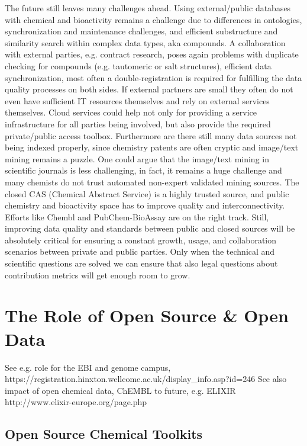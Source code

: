 \documentclass{sig-alternate}
\begin{document}
The future still leaves many challenges ahead. Using external/public databases
with chemical and bioactivity remains a challenge due to differences in
ontologies, synchronization and maintenance challenges, and efficient
substructure and similarity search within complex data types, aka compounds. A
collaboration with external parties, e.g. contract research, poses again
problems with duplicate checking for compounds (e.g. tautomeric or salt
structures), efficient data synchronization, most often a double-registration is
required for fulfilling the data quality processes on both sides. If external
partners are small they often do not even have sufficient IT resources
themselves and rely on external services themselves. Cloud services could help
not only for providing a service infrastructure for all parties being involved,
but also provide the required private/public access toolbox. Furthermore are
there still many data sources not being indexed properly, since chemistry
patents are often cryptic and image/text mining remains a puzzle. One could
argue that the image/text mining in scientific journals is less challenging, in
fact, it remains a huge challenge and many chemists do not trust automated
non-expert validated mining sources. The closed CAS (Chemical Abstract Service)
is a highly trusted source, and public chemistry and bioactivity space has to
improve quality and interconnectivity. Efforts like Chembl and PubChem-BioAssay
are on the right track. Still, improving data quality and standards between
public and closed sources will be absolutely critical for ensuring a constant
growth, usage, and collaboration scenarios between private and public parties.
Only when the technical and scientific questions are solved we can ensure that
also legal questions about contribution metrics will get enough room to grow.

\section{The Role of Open Source \& Open Data}
\label{sec:role-open-source}

See e.g. role for the EBI and genome campus,
https://registration.hinxton.wellcome.ac.uk/display_info.asp?id=246 See also
impact of open chemical data, ChEMBL to future, e.g. ELIXIR
http://www.elixir-europe.org/page.php


\subsection{Open Source Chemical Toolkits}
\end{document}
